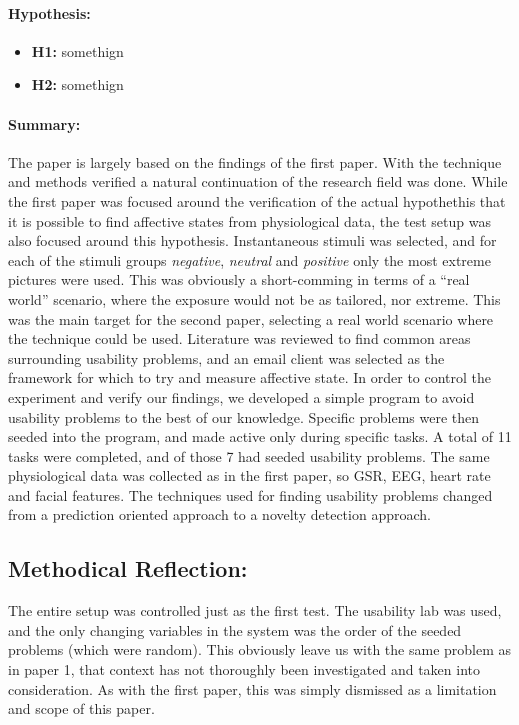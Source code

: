 \paragraph{Hypothesis:}
\begin{itemize}
    \item \textbf{H1:} somethign
    \item \textbf{H2:} somethign
\end{itemize}
\paragraph{Summary:} 
The paper is largely based on the findings of the first paper. With the technique and methods verified a natural continuation of the research field was done. 
While the first paper was focused around the verification of the actual hypothethis that it is possible to find affective states from physiological data, the test setup was also focused around this hypothesis. 
Instantaneous stimuli was selected, and for each of the stimuli groups \textit{negative}, \textit{neutral} and \textit{positive} only the most extreme pictures were used. 
This was obviously a short-comming in terms of a ``real world'' scenario, where the exposure would not be as tailored, nor extreme.
This was the main target for the second paper, selecting a real world scenario where the technique could be used. 
Literature was reviewed to find common areas surrounding usability problems, and an email client was selected as the framework for which to try and measure affective state. 
In order to control the experiment and verify our findings, we developed a simple program to avoid usability problems to the best of our knowledge.
Specific problems were then seeded into the program, and made active only during specific tasks.
A total of 11 tasks were completed, and of those 7 had seeded usability problems. 
The same physiological data was collected as in the first paper, so GSR, EEG, heart rate and facial features. 
The techniques used for finding usability problems changed from a prediction oriented approach to a novelty detection approach.
\subsection{Methodical Reflection:}
The entire setup was controlled just as the first test. The usability lab was used, and the only changing variables in the system was the order of the seeded problems (which were random). This obviously leave us with the same problem as in paper 1, that context has not thoroughly been investigated and taken into consideration. As with the first paper, this was simply dismissed as a limitation and scope of this paper.

